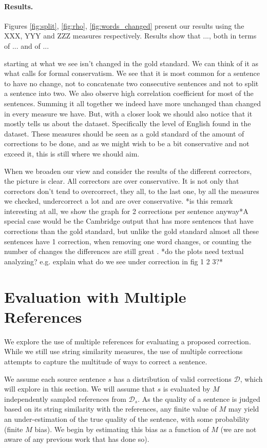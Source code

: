 \documentclass[english]{article}
\begin{document}
\paragraph{Results.}
Figures \ref{fig:split}, \ref{fig:rho}, \ref{fig:words_changed} present our results using the XXX, YYY and ZZZ
measures respectively. Results show that ..., both in terms of ... and of ...

starting at what we see isn't changed in the gold standard. We can think of it as what calls for formal conservatism. We see that it is most common for a sentence to have
no change, not to concatenate two consecutive sentences and not to
split a sentence into two. We also observe high correlation coefficient
for most of the sentences. Summing it all together we indeed have
more unchanged than changed in every measure we have. But, with a
closer look we should also notice that it mostly tells us about the
dataset. Specifically the level of English found in the dataset.
These measures should be seen as a gold standard of the amount of
corrections to be done, and as we might wish to be a bit conservative
and not exceed it, this is still where we should aim.

When we broaden our view and consider the results of the different
correctors, the picture is clear. All correctors are over conservative.
It is not only that correctors don't tend to overcorrect, they all,
to the last one, by all the measures we checked, undercorrect a lot
and are over conservative. {*}is this remark interesting at all, we show the graph for 2 corrections per sentence anyway{*}A special case would be the Cambridge output that has more sentences that have corrections than the gold standard, but unlike the gold standard almost all these sentences have 1 correction, when removing one word changes, or counting the number of changes the differences are still great . {*}do the plots need textual analyzing? e.g. explain what do we see under correction in fig 1 2 3?{*}


\section{Evaluation with Multiple References}\label{sec:increase-reference}

We explore the use of multiple references for evaluating a proposed correction.
While we still use string similarity measures, the use of multiple corrections attempts
to capture the multitude of ways to correct a sentence.

We assume each source sentence $s$ has a distribution of valid corrections $\mathcal{D}$,
which will explore in this section. We will assume that $s$ is evaluated by
$M$ independently sampled references from $\mathcal{D}_s$.
As the quality of a sentence is judged based on its string similarity with the references,
any finite value of $M$ may yield an under-estimation of the true quality of the sentence, 
with some probability (finite $M$ bias). We begin by estimating this bias as a function of $M$
(we are not aware of any previous work that has done so).
\end{document}

